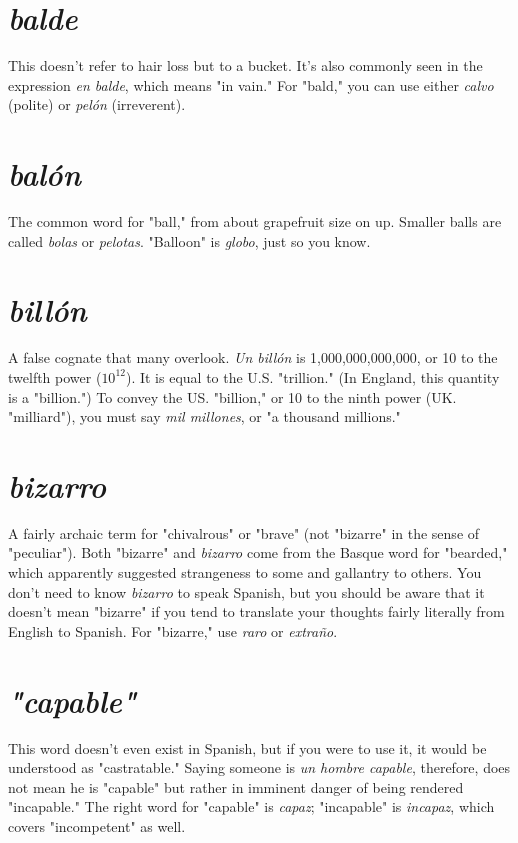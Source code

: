 \documentclass[14pt,a4paper,oneside]{memoir}
\begin{document}
\section{\emph{balde}}

This doesn't refer to hair loss but to a bucket. It's also
commonly seen in the expression \emph{en balde}, which means "in vain."
For "bald," you can use either \emph{calvo} (polite) or \emph{pelón} (irreverent).

\section{\emph{balón}}

The common word for "ball," from about grapefruit
size on up. Smaller balls are called \emph{bolas} or \emph{pelotas}. "Balloon" is
\emph{globo}, just so you know.

\section{\emph{billón}}

A false cognate that many overlook. \emph{Un billón} is
1,000,000,000,000, or 10 to the twelfth power ($10^{12}$). It is equal to the
U.S. "trillion." (In England, this quantity is a "billion.") To convey the
US. "billion," or 10 to the ninth power (UK. "milliard"), you must say
\emph{mil millones}, or "a thousand millions."

\section{\emph{bizarro}}

A fairly archaic term for "chivalrous" or "brave"
(not "bizarre" in the sense of "peculiar"). Both "bizarre" and \emph{bizarro}
come from the Basque word for "bearded," which apparently suggested
strangeness to some and gallantry to others. You don't need to know
\emph{bizarro} to speak Spanish, but you should be aware that it doesn't mean
"bizarre" if you tend to translate your thoughts fairly literally from English to Spanish. For "bizarre," use \emph{raro} or \emph{extraño}.

\section{\emph{"capable"}}

This word doesn't even exist in Spanish, but if
you were to use it, it would be understood as "castratable." Saying
someone is \emph{un hombre capable}, therefore, does not mean he is "capable" but rather in imminent danger of being rendered "incapable."
The right word for "capable" is \emph{capaz}; "incapable" is \emph{incapaz}, which
covers "incompetent" as well.
\end{document}
